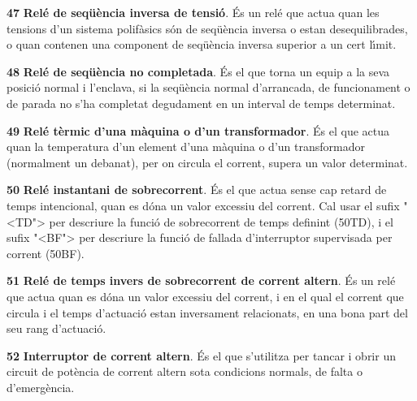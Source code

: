 \begin{multicols}{2}
\begin{list}{}
\item[\textbf{47}]   
\textbf{Rel\'{e}
de seq\"{u}\`{e}ncia inversa de tensi\'{o}}. \'{E}s un rel\'{e} que actua quan les
tensions d'un sistema polif\`{a}sics s\'{o}n de seq\"{u}\`{e}ncia inversa o estan
desequilibrades, o quan contenen una component de seq\"{u}\`{e}ncia inversa
superior a un cert l\'{\i}mit.

\item[\textbf{48}]   
\textbf{Rel\'{e} de seq\"{u}\`{e}ncia
no completada}. \'{E}s el que torna un equip a la seva posici\'{o} normal  i
l'enclava, si la seq\"{u}\`{e}ncia normal d'arrancada, de funcionament o de
parada no s'ha completat degudament en un interval de temps
determinat.

\item[\textbf{49}]  
\textbf{Rel\'{e} t\`{e}rmic d'una m\`{a}quina o d'un transformador}. \'{E}s el que
actua quan la temperatura d'un element d'una m\`{a}quina o d'un
transformador (normalment un debanat), per on circula el corrent,
supera un valor determinat.

\item[\textbf{50}]   
\textbf{Rel\'{e} instantani de sobrecorrent}. \'{E}s el que actua sense cap retard de temps intencional, quan es d\'{o}na un valor excessiu del
corrent. Cal usar el sufix {"<}TD{">} per descriure la funci\'{o} de sobrecorrent de temps definint (50TD), i el sufix {"<}BF{">} per descriure la funci\'{o} de fallada d'interruptor supervisada per corrent (50BF).

\item[\textbf{51}]  
\textbf{Rel\'{e} de temps invers  de sobrecorrent de corrent altern}. \'{E}s
un rel\'{e} que actua quan es d\'{o}na un valor excessiu del corrent, i en el qual el corrent que circula i el temps d'actuaci\'{o} estan inversament relacionats, en una bona part del seu rang d'actuaci\'{o}.

\item[\textbf{52}]   
\textbf{Interruptor de corrent altern}. \'{E}s
 el que s'utilitza per tancar i obrir un circuit de pot\`{e}ncia de corrent altern sota condicions
normals, de falta o d'emerg\`{e}ncia.


\end{list}
\end{multicols}
